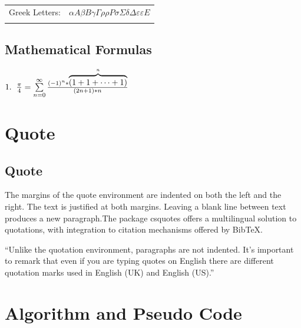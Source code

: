 \documentclass[12pt]{article}
\begin{document}
\hspace{0cm}

\begin{center}
\begin{tabular}{|c|c|}
    \hline
   Greek Letters:  &  
   $\alpha A \beta B \gamma \Gamma \rho \rho P \sigma \Sigma \delta \Delta \varepsilon \varepsilon E$
   \\ 
	& \\
   \hline
\end{tabular}
\end{center}

\subsection{Mathematical Formulas}

\begin{math}
    1.\hspace*{0.2cm} \frac{\pi}{4} = \sum\limits_{n=0}^{\infty} \frac{(-1)^n * \overbrace{(1+1+\cdots+1)}^{n} }{(2n+1)*n}
\end{math}


\newpage
\section{Quote}

\subsection{Quote}
The margins of the quote environment are indented on both the left and the
right. The text is justified at both margins. Leaving a blank line between text
produces a new paragraph.The package csquotes offers a multilingual solution
to quotations, with integration to citation mechanisms offered by BibTeX.
\begin{center}

\setlength{\leftskip}{1cm}
\setlength{\rightskip}{1cm}

{“Unlike the quotation environment, paragraphs are not indented. It’s important to remark that even if you are typing quotes on English there are different quotation marks used in English (UK) and English (US).”}

\setlength{\leftskip}{0cm}
\setlength{\rightskip}{0cm}

\end{center}

\section{Algorithm and Pseudo Code}
\end{document}
